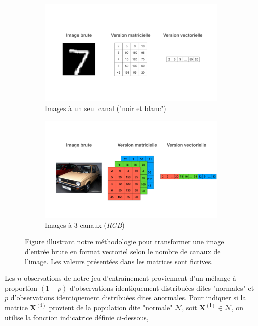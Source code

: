 \begin{figure}[h]
	\centering
	\begin{subfigure}{12cm}
		\centering
		\includegraphics[width=1\linewidth]{images/keynote/one-hot-transfo}
		\caption{Images à un seul canal ("noir et blanc")}
	\end{subfigure}
	\begin{subfigure}{12cm}
		\centering
		\includegraphics[width=1\linewidth]{images/keynote/one-hot-transfo-rgb}
		\caption{Images à 3 canaux (\textit{RGB})}
	\end{subfigure}
	\caption{Figure illustrant notre méthodologie pour transformer une image d'entrée brute en format vectoriel selon le nombre de canaux de l'image. Les valeurs présentées dans les matrices sont fictives.}
		\label{fig:one_hot}
\end{figure}


Les $n$ observations de notre jeu d'entraînement proviennent d'un mélange à proportion $(1-p)$ d'observations identiquement distribuées dites "normales" et $p$ d'observations identiquement distribuées dites anormales. Pour indiquer si la matrice $\boldsymbol{X^{(i)}}$ provient de la population dite "normale" $\mathcal{N}$, soit $ \boldsymbol{X^{(i)}}\in\mathcal{N}$, on utilise la fonction indicatrice définie ci-dessous,

